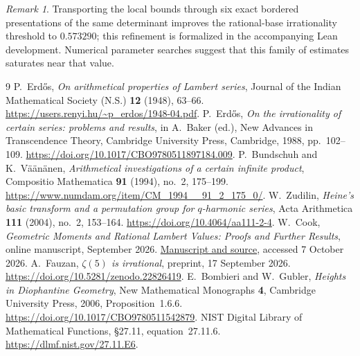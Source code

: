 \documentclass[12pt]{article}
\theoremstyle{remark}
\newtheorem{remark}[theorem]{Remark}
\begin{document}
\begin{remark}
Transporting the local bounds through six exact bordered presentations of the
same determinant improves the rational-base irrationality threshold to
$0.573290$; this refinement is formalized in the accompanying Lean development.
Numerical parameter searches suggest that this family of estimates saturates
near that value.
\end{remark}

\begin{thebibliography}{9}
P.~Erd\H{o}s, \emph{On arithmetical properties of Lambert series},
Journal of the Indian Mathematical Society (N.S.) \textbf{12} (1948), 63--66.
\url{https://users.renyi.hu/~p_erdos/1948-04.pdf}.
P.~Erd\H{o}s, \emph{On the irrationality of certain series: problems and results},
in A.~Baker (ed.), New Advances in Transcendence Theory,
Cambridge University Press, Cambridge, 1988, pp.~102--109.
\url{https://doi.org/10.1017/CBO9780511897184.009}.
P.~Bundschuh and K.~V\"a\"an\"anen, \emph{Arithmetical investigations of a certain infinite product},
Compositio Mathematica \textbf{91} (1994), no.~2, 175--199.
\url{https://www.numdam.org/item/CM_1994__91_2_175_0/}.
W.~Zudilin, \emph{Heine's basic transform and a permutation group for $q$-harmonic series},
Acta Arithmetica \textbf{111} (2004), no.~2, 153--164.
\url{https://doi.org/10.4064/aa111-2-4}.
W.~Cook, \emph{Geometric Moments and Rational Lambert Values: Proofs and Further Results},
online manuscript, September 2026.
\href{https://wcook04.github.io/plectis/maths/papers/erdos1049-rational-base-lambert-reasoning-surface.html}{Manuscript and source}, accessed 7 October 2026.
A.~Fauzan, \emph{$\zeta(5)$ is irrational}, preprint, 17 September 2026.
\url{https://doi.org/10.5281/zenodo.22826419}.
E.~Bombieri and W.~Gubler, \emph{Heights in Diophantine Geometry},
New Mathematical Monographs \textbf{4}, Cambridge University Press, 2006,
Proposition~1.6.6.
\url{https://doi.org/10.1017/CBO9780511542879}.
NIST Digital Library of Mathematical Functions, \S27.11, equation~27.11.6.
\url{https://dlmf.nist.gov/27.11.E6}.
\end{thebibliography}
\end{document}
